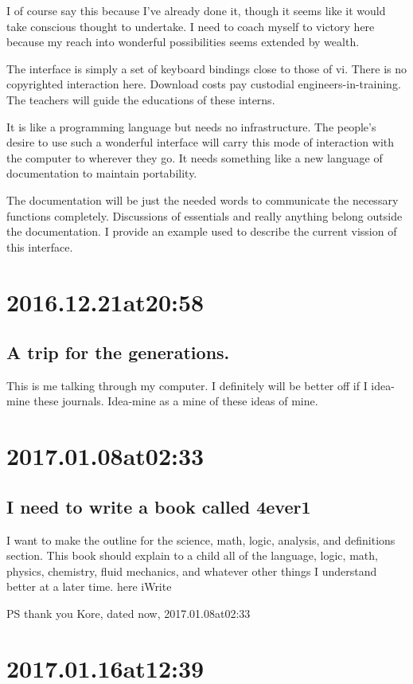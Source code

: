 I of course say this because I've already done it, though it seems like it would take conscious thought to undertake. I need to coach myself to victory here because my reach into wonderful possibilities seems extended by wealth.

The interface is simply a set of keyboard bindings close to those of vi. There is no copyrighted interaction here. Download costs pay custodial engineers-in-training. The teachers will guide the educations of these interns.

It is like a programming language but needs no infrastructure. The people's desire to use such a wonderful interface will carry this mode of interaction with the computer to wherever they go. It needs something like a new language of documentation to maintain portability.

The documentation will be just the needed words to communicate the necessary functions completely. Discussions of essentials and really anything belong outside the documentation. I provide an example used to describe the current vission of this interface.



\section*{ 2016.12.21at20:58 }
\subsection*{ A trip for the generations. }
This is me talking through my computer. I definitely will be better off if I idea-mine these journals. Idea-mine as a mine of these ideas of mine.

\section*{ 2017.01.08at02:33 }
\subsection*{ I need to write a book called 4ever1 }
I want to make the outline for the science, math, logic, analysis, and definitions section. This book should explain to a child all of the language, logic, math, physics, chemistry, fluid mechanics, and whatever other things I understand better at a later time. here iWrite

PS thank you Kore, dated now, 2017.01.08at02:33

\section*{ 2017.01.16at12:39 }
